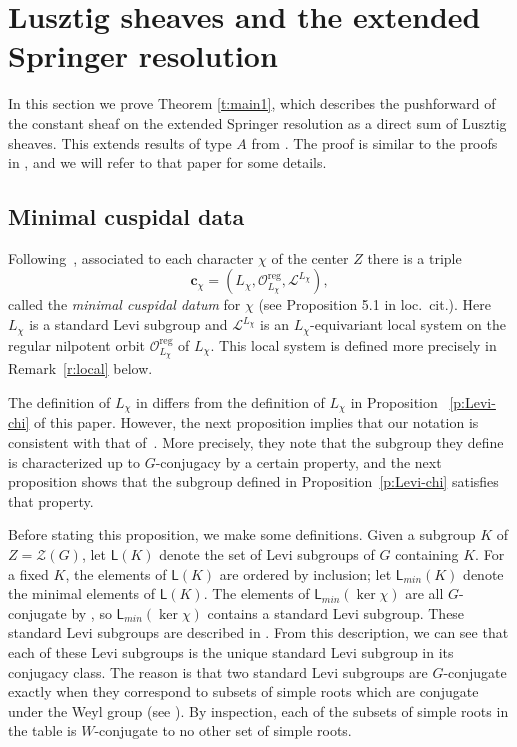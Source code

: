\documentclass[reqno,11pt]{amsart}
\theoremstyle{remark}
\theoremstyle{remark}
\theoremstyle{definition}
\theoremstyle{definition}
\theoremstyle{definition}
\numberwithin{equation}{section}
\renewcommand{\ker}{\operatorname{ker }}
\newcommand{\cl}{\mathcal{L}}
\newcommand{\co}{\mathcal{O}}
\newcommand{\cz}{\mathcal{Z}}
\newcommand{\vc}{\mathbf{c}}
\newcommand{\reg}{\mathrm{reg}}
\newcommand{\sfl}{\mathsf{L}}
\begin{document}
\section{Lusztig sheaves and the extended Springer resolution} \label{s.Lusztig}
In this section we prove Theorem \ref{t:main1}, which describes the pushforward of the constant sheaf on the extended Springer resolution as a direct sum of Lusztig sheaves.
This extends results of type $A$ from \cite{GPR23}.  The proof is similar to the proofs in \cite{GPR23}, and we will refer to that paper for some details.


\subsection{Minimal cuspidal data} \label{ss:minimal}
Following~\cite{AHJR3}, associated to each character $\chi$ of the center $Z$ there is a triple
$$
\vc_{\chi} = (L_{\chi},\co^{\reg}_{L_{\chi}}, \cl^{L_\chi}),
$$
called the \emph{minimal cuspidal datum} for $\chi$ (see Proposition 5.1 in loc.~cit.). Here $L_\chi$ is a standard Levi subgroup and $\cl^{L_\chi}$ is an $L_{\chi}$-equivariant local system on the regular nilpotent orbit $\co^{\reg}_{L_{\chi}}$ of $L_{\chi}$.  This local system is defined more precisely in Remark~\ref{r:local} below.  

The definition of $L_{\chi}$ in \cite[Prop.~5.1]{AHJR3} differs from the definition of $L_\chi$ in Proposition ~\ref{p:Levi-chi} of this paper.
However, the next proposition implies that our notation is consistent with that of~\cite{AHJR3}.
More precisely, they note that the subgroup they define is characterized up to $G$-conjugacy by a certain property, 
and the next proposition shows that the subgroup defined in Proposition~\ref{p:Levi-chi} satisfies that property. 

Before stating this proposition, we make some definitions. Given a subgroup $K$ of $Z = \cz(G)$, let $\sfl(K)$ denote the set of Levi subgroups of $G$ containing $K$.
For a fixed $K$, the elements of $\sfl(K)$ are ordered by inclusion; let $\mathsf{L}_{min}(K)$ denote the minimal elements of 
$\sfl(K)$.   
The elements of $\sfl_{min}(\ker \chi)$ are all $G$-conjugate by \cite[Lemma 2.16]{Bonnafe2004}, so $\sfl_{min}(\ker \chi)$ 
contains a standard Levi subgroup.  These standard Levi subgroups are described in \cite[Table 2.17]{Bonnafe2004}.
From this description, we can see that each of these Levi subgroups
is the unique standard Levi subgroup in its conjugacy class.  The reason is that
two standard Levi subgroups are $G$-conjugate exactly when they correspond to subsets of simple roots which are
conjugate under the Weyl group (see \cite{Solleveld2020}).  By inspection,
each of the subsets of simple roots in the table is $W$-conjugate to no other set of simple roots.
\end{document}
